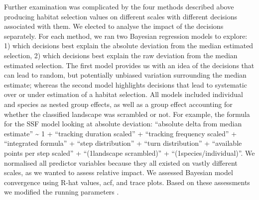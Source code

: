 \documentclass[10pt,a4paper]{article}
\begin{document}
Further examination was complicated by the four methods described above producing habitat selection values on different scales with different decisions associated with them.
We elected to analyse the impact of the decisions separately.
For each method, we ran two Bayesian regression models to explore: 1) which decisions best explain the absolute deviation from the median estimated selection, 2) which decisions best explain the raw deviation from the median estimated selection.
The first model provides us with an idea of the decisions that can lead to random, but potentially unbiased variation surrounding the median estimate; whereas the second model highlights decisions that lead to systematic over or under estimation of a habitat selection.
All models included individual and species as nested group effects, as well as a group effect accounting for whether the classified landscape was scrambled or not.
For example, the formula for the SSF model looking at absolute deviation: ``absolute delta from median estimate'' \textasciitilde{} 1 + ``tracking duration scaled'' + ``tracking frequency scaled'' + ``integrated formula'' + ``step distribution'' + ``turn distribution'' + ``available points per step scaled'' + ``(1\textbar landscape scrambled)'' + ``(1\textbar species/individual)''.
We normalised all predictor variables because they all existed on vastly different scales, as we wanted to assess relative impact.
We assessed Bayesian model convergence using R-hat values, acf, and trace plots.
Based on these assessments we modified the running parameters .
\end{document}
